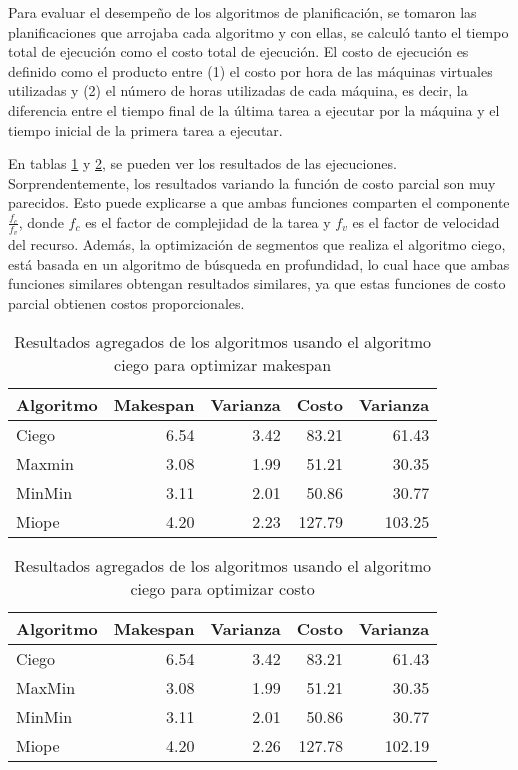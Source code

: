 Para evaluar el desempeño de los algoritmos de planificación, se tomaron las planificaciones que arrojaba cada algoritmo y con ellas, se calculó tanto el tiempo total de ejecuci\'on como el costo total de ejecución. El costo de ejecución es definido como el producto entre (1) el costo por hora de las máquinas virtuales utilizadas y (2) el número de horas utilizadas de cada máquina, es decir, la diferencia entre el tiempo final de la última tarea a ejecutar por la máquina y el tiempo inicial de la primera tarea a ejecutar.

En tablas \ref{table:results_makespan} y \ref{table:results_cost}, se pueden ver los resultados de las ejecuciones. Sorprendentemente, los resultados variando la funci\'on de costo parcial son muy parecidos. Esto puede explicarse a que ambas funciones comparten el componente $\frac{f_c}{f_v}$, donde $f_c$ es el factor de complejidad de la tarea y $f_v$ es el factor de velocidad del recurso. Además, la optimización de segmentos que realiza el algoritmo ciego, está basada en un algoritmo de búsqueda en profundidad, lo cual hace que ambas funciones similares obtengan resultados similares, ya que estas funciones de costo parcial obtienen costos proporcionales.


\begin{table}[ht]
\centering
\begin{tabular}{lrrrr}
  \hline
Algoritmo & Makespan & Varianza & Costo & Varianza \\ 
  \hline
  Ciego & 6.54 & 3.42 & 83.21 & 61.43 \\ 
  Maxmin & 3.08 & 1.99 & 51.21 & 30.35 \\ 
  MinMin & 3.11 & 2.01 & 50.86 & 30.77 \\ 
  Miope & 4.20 & 2.23 & 127.79 & 103.25 \\ 
  \hline
\end{tabular}
\caption{Resultados agregados de los algoritmos usando el algoritmo ciego para optimizar makespan} 
\label{table:results_makespan}
\end{table}


\begin{table}[ht]
\centering
\begin{tabular}{lrrrr}
  \hline
Algoritmo & Makespan & Varianza & Costo & Varianza \\ 
  \hline
  Ciego & 6.54 & 3.42 & 83.21 & 61.43 \\ 
  MaxMin & 3.08 & 1.99 & 51.21 & 30.35 \\ 
  MinMin & 3.11 & 2.01 & 50.86 & 30.77 \\ 
  Miope & 4.20 & 2.26 & 127.78 & 102.19 \\ 
  \hline
\end{tabular}
\caption{Resultados agregados de los algoritmos usando el algoritmo ciego para optimizar costo} 
\label{table:results_cost}
\end{table}


